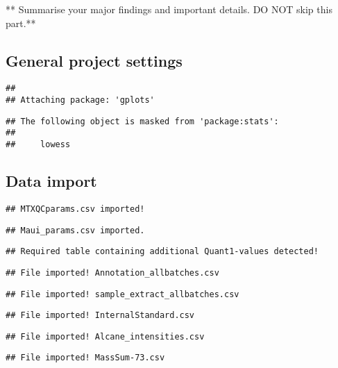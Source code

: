 \documentclass[9pt,]{article}
\begin{document}
** Summarise your major findings and important details. DO NOT skip this
part.**

\subsection{General project settings}\label{general-project-settings}

\begin{verbatim}
## 
## Attaching package: 'gplots'
\end{verbatim}

\begin{verbatim}
## The following object is masked from 'package:stats':
## 
##     lowess
\end{verbatim}

\subsection{Data import}\label{data-import}

\begin{verbatim}
## MTXQCparams.csv imported!
\end{verbatim}

\begin{verbatim}
## Maui_params.csv imported.
\end{verbatim}

\begin{verbatim}
## Required table containing additional Quant1-values detected!
\end{verbatim}

\begin{verbatim}
## File imported! Annotation_allbatches.csv
\end{verbatim}

\begin{verbatim}
## File imported! sample_extract_allbatches.csv
\end{verbatim}

\begin{verbatim}
## File imported! InternalStandard.csv
\end{verbatim}

\begin{verbatim}
## File imported! Alcane_intensities.csv
\end{verbatim}

\begin{verbatim}
## File imported! MassSum-73.csv
\end{verbatim}
\end{document}

